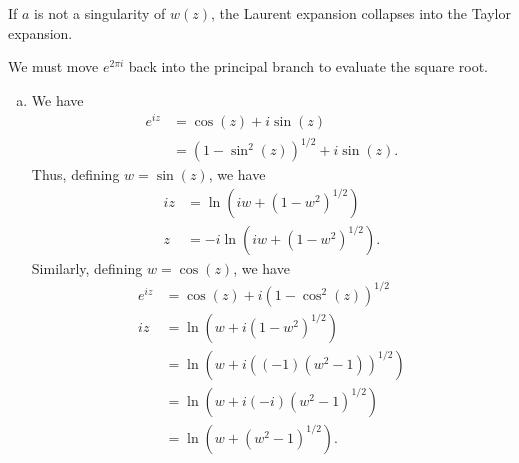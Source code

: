 \documentclass[10pt]{mypackage}
\begin{document}
\begin{solution}[19.9]
  If $a$ is not a singularity of $w(z)$, the Laurent expansion collapses into the Taylor expansion.
\end{solution}
\begin{solution}[19.11]

\end{solution}
\begin{solution}[19.13]

\end{solution}
\begin{solution}[19.18]

\end{solution}
\begin{solution}[19.24]
  We must move $e^{2\pi i}$ back into the principal branch to evaluate the square root.
\end{solution}
\begin{solution}[19.28]\hfill
  \begin{enumerate}[(a)]
    \item We have
      \begin{align*}
        e^{iz} &= \cos(z) + i\sin(z)\\
               &= \left( 1-\sin^2(z) \right)^{1/2} + i\sin(z).
      \end{align*}
      Thus, defining $w = \sin(z)$, we have
      \begin{align*}
        iz &= \ln\left( iw + \left( 1- w^2\right)^{1/2} \right)\\
        z &= -i\ln\left( iw + \left( 1-w^2 \right)^{1/2} \right).
      \end{align*}
      Similarly, defining $w = \cos(z)$, we have
      \begin{align*}
        e^{iz} &= \cos(z) + i\left( 1-\cos^2(z) \right)^{1/2}\\
        iz &= \ln\left( w + i\left( 1-w^2 \right)^{1/2} \right)\\
           &= \ln\left( w + i\left( \left( -1 \right)\left( w^2 - 1 \right) \right)^{1/2} \right)\\
           &= \ln\left( w + i\left( -i \right)\left( w^2 - 1 \right)^{1/2} \right)\\
           &= \ln\left( w + \left( w^2 - 1 \right)^{1/2} \right).
      \end{align*}
  \end{enumerate}
\end{solution}
\end{document}
